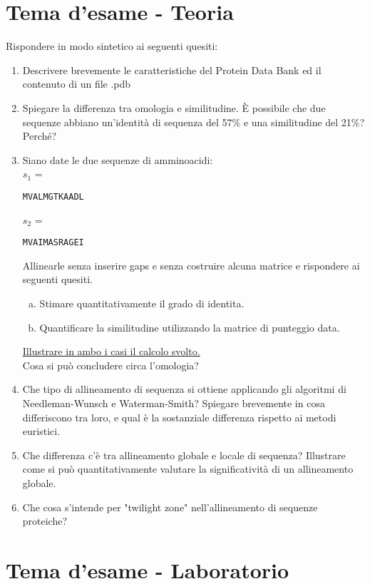 \documentclass{article}
\begin{document}
\section*{Tema d'esame - Teoria}
Rispondere in modo sintetico ai seguenti quesiti:
\begin{enumerate}[1)]
   \item Descrivere brevemente le caratteristiche del Protein Data Bank ed il contenuto di un file .pdb
   \item Spiegare la differenza tra omologia e similitudine. È possibile che due sequenze abbiano un'identità di sequenza del 57\% e una similitudine del 21\%? Perché?
   \item Siano date le due sequenze di amminoacidi:\\
      $s_{1}$ = \begin{verbatim}MVALMGTKAADL\end{verbatim}
      $s_{2}$ = \begin{verbatim}MVAIMASRAGEI\end{verbatim}
      Allinearle senza inserire gaps e senza costruire alcuna matrice e rispondere ai seguenti quesiti.
      \begin{enumerate}[a)]
         \item Stimare quantitativamente il grado di identita.
         \item Quantificare la similitudine utilizzando la matrice di punteggio data.
      \end{enumerate}
      \underline{Illustrare in ambo i casi il calcolo svolto.}\\
      Cosa si può concludere circa l'omologia?
   \item Che tipo di allineamento di sequenza si ottiene applicando gli algoritmi di Needleman-Wunsch e Waterman-Smith? Spiegare brevemente in cosa differiscono tra loro, e qual è la sostanziale differenza rispetto ai metodi euristici.
   \item Che differenza c'è tra allineamento globale e locale di sequenza? Illustrare come si può quantitativamente valutare la significatività di un allineamento globale.
   \item Che cosa s'intende per "twilight zone" nell'allineamento di sequenze proteiche?
\end{enumerate}


\newpage
\section*{Tema d'esame - Laboratorio}
\end{document}
